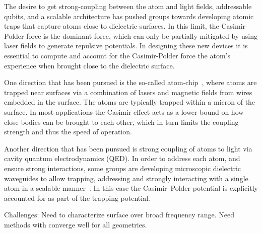The desire to get strong-coupling between the atom and light fields, addressable qubits, and a scalable
architecture has pushed groups towards developing atomic traps that capture atoms close to dielectric surfaces.  
In this limit, the Casimir--Polder force is the dominant force, which can only be partially mitigated
by using laser fields to generate repulsive potentials.
  In designing these new devices it is essential to compute and account for the Casimir-Polder force
the atom's experience when brought close to the dielectric surface.  

    One direction that has been pursued is the so-called atom-chip~\cite{Folman2000,Schneider2003},
    where atoms are trapped near surfaces via a combination of lasers and magnetic fields from wires embedded in
    the surface.  The atoms are typically trapped within a micron of the surface.  
    In most applications the Casimir effect acts as a lower bound on how close bodies can be brought 
    to each other, which in turn limits the coupling strength and thus the speed of operation.  

    Another direction that has been pursued is strong coupling of atoms to light via cavity 
    quantum electrodynamics (QED).  
    In order to address each atom, and ensure strong interactions, some groups 
    are developing microscopic dielectric waveguides to allow trapping, addressing and strongly interacting with a 
    single atom in a scalable manner~\cite{Alton2011, Hung2013, Goban2014}.  In this case
    the Casimir--Polder potential is explicitly accounted for as part of the trapping potential.
    
Challenges:  Need to characterize surface over broad frequency range.
Need methods with converge well for all geometries.  

